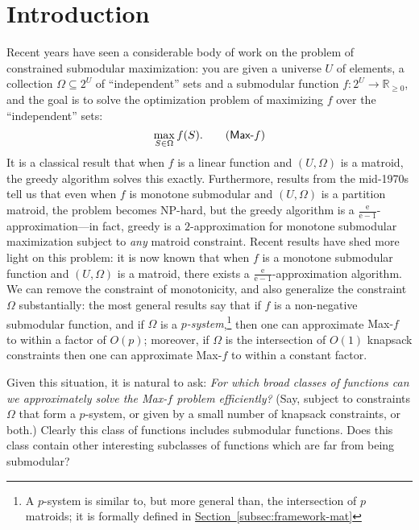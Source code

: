 \documentclass[11pt,letterpaper]{article}
\newcommand{\lref}[2][]{\hyperref[#2]{#1~\ref*{#2}}}
\newcommand{\R}[0]{{\ensuremath{\mathbb{R}}}}
\newcommand{\sse}{\subseteq}
\newcommand{\I}{{\Omega}}
\newcommand{\eeminusone}{\frac{\mathrm{e}}{\mathrm{e}-1}}
\newcounter{note}[section]
\begin{document}
\section{Introduction}

\newcommand{\maxf}{\textsf{Max-$f$}\xspace}

Recent years have seen a considerable body of work on the problem of constrained submodular maximization: you are given
a universe $U$ of elements, a collection $\I \sse 2^U$ of ``independent'' sets and a submodular function $f: 2^U \to
\R_{\geq 0}$, and the goal is to solve the optimization problem of maximizing $f$ over the ``independent'' sets:
\begin{equation}
  \max_{S \in \I} f(S). \tag{\maxf}
\end{equation}
It is a classical result that when $f$ is a linear function and $(U, \I)$ is a matroid, the greedy algorithm solves
this exactly. Furthermore, results from the mid-1970s tell us that even when $f$ is monotone submodular and $(U, \I)$
is a partition matroid, the problem becomes NP-hard, but the greedy algorithm is a $\eeminusone$-approximation---in
fact, greedy is a $2$-approximation for monotone submodular maximization subject to \emph{any} matroid constraint.
Recent results have shed more light on this problem: it is now known that when $f$ is a monotone submodular function
and $(U, \I)$ is a matroid, there exists a $\eeminusone$-approximation algorithm. We can remove the constraint of
monotonicity, and also generalize the constraint $\I$ substantially: the most general results say that if $f$ is a
non-negative submodular function, and if $\I$ is a \emph{$p$-system},\footnote{A $p$-system is
  similar to, but more general than, the intersection of $p$ matroids;
  it is formally defined in \lref[Section]{subsec:framework-mat}} then one
can approximate \maxf to within a factor of $O(p)$; moreover, if $\I$ is the intersection of $O(1)$ knapsack
constraints then one can approximate \maxf to within a constant factor.

Given this situation, it is natural to ask: \emph{For which broad
  classes of functions can we approximately solve the \textsf{Max-$f$}
  problem efficiently?} (Say, subject to constraints $\I$ that form a
$p$-system, or given by a small number of knapsack constraints, or
both.) Clearly this class of functions includes submodular functions.
Does this class contain other interesting subclasses of functions which
are far from being submodular?
\end{document}
